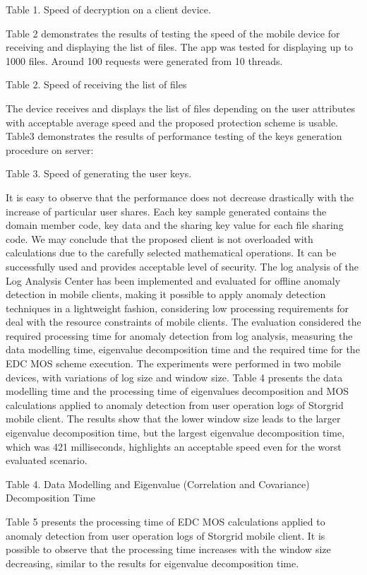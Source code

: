 \documentclass[twocolumn]{svjour3}          	%
\begin{document}
Table 1. Speed of decryption on a client device.

Table 2 demonstrates the results of testing the speed of the mobile device for receiving and displaying the list of files. The app was tested for displaying up to 1000 files. Around 100 requests were generated from 10 threads.

Table 2. Speed of receiving the list of files

The device receives and displays the list of files depending on the user attributes with acceptable average speed and the proposed protection scheme is usable. Table3 demonstrates the results of performance testing of the keys generation procedure on server:

Table 3. Speed of generating the user keys.

It is easy to observe that the performance does not decrease drastically with the increase of particular user shares. Each key sample generated contains the domain member code, key data and the sharing key value for each file sharing code. We may conclude that the proposed client is not overloaded with calculations due to the carefully selected mathematical operations. It can be successfully used and provides acceptable level of security.
The log analysis of the Log Analysis Center has been implemented and evaluated for offline anomaly detection in mobile clients, making it possible to apply anomaly detection techniques in a lightweight fashion, considering low processing requirements for deal with the resource constraints of mobile clients. The evaluation considered the required processing time for anomaly detection from log analysis, measuring the data modelling time, eigenvalue decomposition time and the required time for the EDC MOS scheme execution. The experiments were performed in two mobile devices, with variations of log size and window size. 
Table 4 presents the data modelling time and the processing time of eigenvalues decomposition and MOS calculations applied to anomaly detection from user operation logs of Storgrid mobile client. The results show that the lower window size leads to the larger eigenvalue decomposition time, but the largest eigenvalue decomposition time, which was 421 milliseconds, highlights an acceptable speed even for the worst evaluated scenario.

Table 4. Data Modelling and Eigenvalue (Correlation and Covariance) Decomposition Time 

Table 5 presents the processing time of EDC MOS calculations applied to anomaly detection from user operation logs of Storgrid mobile client. It is possible to observe that the processing time increases with the window size decreasing, similar to the results for eigenvalue decomposition time. 
\end{document}
